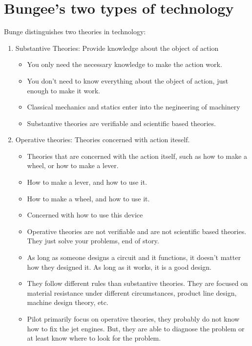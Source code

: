 \documentclass{article}
\begin{document}
\section*{Bungee's two types of technology}
Bunge distinguishes two theories in technology:
\begin{enumerate}
  \item Substantive Theories: Provide knowledge
    about the object of action
    \begin{itemize}
      \item You only need the necessary knowledge
        to make the action work.
      \item You don't need to know everything about the
        object of action, just enough to make it work.
      \item Classical mechanics and statics enter
        into the negineering of machinery
      \item Substantive theories are verifiable
        and scientific based theories.
    \end{itemize}
  \item Operative theories: Theories
    concerned with action iteself.
    \begin{itemize}
      \item Theories that are concerned with the action itself,
        such as how to make a wheel, or how to make a lever.
      \item How to make a lever, and how to use it.
      \item How to make a wheel, and how to use it.
      \item Concerned with how to use this device
      \item Operative theories are not verifiable
        and are not scientific based theories.
        They just solve your problems, end of story.
      \item As long as someone designs a circuit and it functions,
        it doesn't matter how they designed it.
        As long as it works, it is a good design.
      \item They follow different rules than substantive theories.
        They are focused on material resistance under different circumstances,
        product line design, machine design theory, etc.
      \item Pilot primarily focus on operative theories,
        they probably do not know how to fix the jet engines.
        But, they are able to diagnose the problem or at
        least know where to look for the problem.


\end{itemize}
\end{enumerate}
\end{document}
